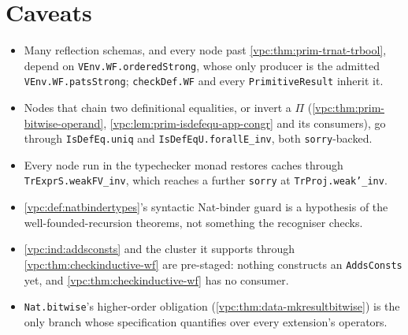 \section*{Caveats}
\label{sec:vpc-contribution}
\label{sec:vpc-review}
\begin{itemize}
\item Many reflection schemas, and every node past \ref{vpc:thm:prim-trnat-trbool}, depend on
\texttt{VEnv.WF.orderedStrong}, whose only producer is the admitted
\texttt{VEnv.WF.patsStrong}; \texttt{checkDef.WF} and every \texttt{PrimitiveResult} inherit it.
\item Nodes that chain two definitional equalities, or invert a $\Pi$
(\ref{vpc:thm:prim-bitwise-operand}, \ref{vpc:lem:prim-isdefequ-app-congr} and its consumers), go
through \texttt{IsDefEq.uniq} and \texttt{IsDefEqU.forallE\_inv}, both \texttt{sorry}-backed.
\item Every node run in the typechecker monad restores caches through
\texttt{TrExprS.weakFV\_inv}, which reaches a further \texttt{sorry} at
\texttt{TrProj.weak'\_inv}.
\item \ref{vpc:def:natbindertypes}'s syntactic Nat-binder guard is a hypothesis of the
well-founded-recursion theorems, not something the recogniser checks.
\item \ref{vpc:ind:addsconsts} and the cluster it supports through
\ref{vpc:thm:checkinductive-wf} are pre-staged: nothing constructs an \texttt{AddsConsts} yet,
and \ref{vpc:thm:checkinductive-wf} has no consumer.
\item \texttt{Nat.bitwise}'s higher-order obligation (\ref{vpc:thm:data-mkresultbitwise}) is the
only branch whose specification quantifies over every extension's operators.
\end{itemize}
